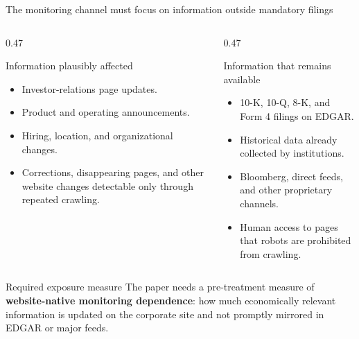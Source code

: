 \documentclass[aspectratio=169,10pt]{beamer}
\newcommand{\tightitems}{\setlength\itemsep{0.11cm}\setlength\parskip{0pt}}
\begin{document}
\begin{frame}[t,shrink=3]{The monitoring channel must focus on information outside mandatory filings}
\begin{columns}[T,onlytextwidth]
  \begin{column}{0.47\textwidth}
    \begin{exampleblock}{Information plausibly affected}
    \small
    \begin{itemize}\tightitems
      \item Investor-relations page updates.
      \item Product and operating announcements.
      \item Hiring, location, and organizational changes.
      \item Corrections, disappearing pages, and other website changes detectable only through repeated crawling.
    \end{itemize}
    \end{exampleblock}
  \end{column}
  \begin{column}{0.47\textwidth}
    \begin{alertblock}{Information that remains available}
    \small
    \begin{itemize}\tightitems
      \item 10-K, 10-Q, 8-K, and Form 4 filings on EDGAR.
      \item Historical data already collected by institutions.
      \item Bloomberg, direct feeds, and other proprietary channels.
      \item Human access to pages that robots are prohibited from crawling.
    \end{itemize}
    \end{alertblock}
  \end{column}
\end{columns}

\begin{block}{Required exposure measure}
The paper needs a pre-treatment measure of \textbf{website-native monitoring dependence}: how much economically relevant information is updated on the corporate site and not promptly mirrored in EDGAR or major feeds.
\end{block}
\end{frame}
\end{document}
